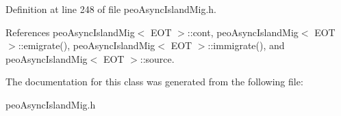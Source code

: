 Definition at line 248 of file peo\-Async\-Island\-Mig.h.

References peo\-Async\-Island\-Mig$<$ EOT $>$::cont, peo\-Async\-Island\-Mig$<$ EOT $>$::emigrate(), peo\-Async\-Island\-Mig$<$ EOT $>$::immigrate(), and peo\-Async\-Island\-Mig$<$ EOT $>$::source.

The documentation for this class was generated from the following file:\begin{CompactItemize}
\item 
peo\-Async\-Island\-Mig.h\end{CompactItemize}
